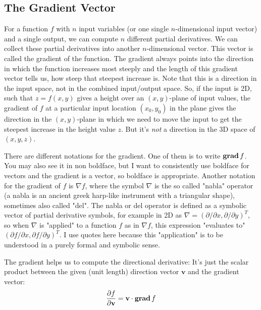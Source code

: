 \subsection{The Gradient Vector}
For a function $f$ with $n$ input variables (or one single $n$-dimensional input vector) and a single output, we can compute $n$ different partial derivatives. We can collect these partial derivatives into another $n$-dimensional vector. This vector is called the gradient of the function. The gradient always points into the direction in which the function increases most steeply and the length of this gradient vector tells us, how steep that steepest increase is. Note that this is a direction in the input space, not in the combined input/output space. So, if the input is 2D, such that $z = f(x,y)$ gives a height over an $(x,y)$-plane of input values, the gradient of $f$ at a particular input location $(x_0,y_0)$ in the plane gives the direction in the $(x,y)$-plane in which we need to move the input to get the steepest increase in the height value $z$. But it's \emph{not} a direction in the 3D space of $(x,y,z)$.

\medskip
There are different notations for the gradient. One of them is to write $\operatorname{\mathbf{grad}} f$. You may also see it in non boldface, but I want to consistently use boldface for vectors and the gradient is a vector, so boldface is appropriate. Another notation for the gradient of $f$ is $\nabla f$, where the symbol $\nabla$ is the so called "nabla" operator (a nabla is an ancient greek harp-like instrument with a triangular shape), sometimes also called "del". The nabla or del operator is defined as a symbolic vector of partial derivative symbols, for example in 2D as $\nabla = (\partial / \partial x, \partial / \partial y)^T$, so when $\nabla$ is "applied" to a function $f$ as in $\nabla f$, this expression "evaluates to" $(\partial f / \partial x, \partial f / \partial y)^T$. I use quotes here because this "application" is to be understood in a purely formal and symbolic sense.

\medskip
The gradient helps us to compute the directional derivative: It's just the scalar product between the given (unit length) direction vector $\mathbf{v}$ and the gradient vector:
\begin{equation}
 \frac{\partial f}{\partial \mathbf{v}} = \mathbf{v} \cdot \operatorname{\mathbf{grad}} f
\end{equation}

